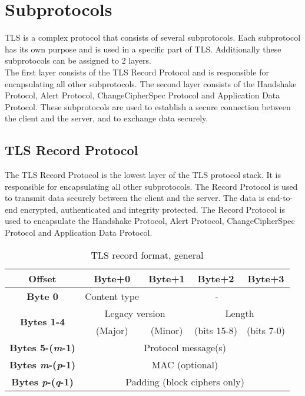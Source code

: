 \section{Subprotocols}

TLS is a complex protocol that consists of several subprotocols. Each subprotocol has its own purpose and is used in a specific part of TLS. Additionally these subprotocols can be assigned to 2 layers.
\\
The first layer consists of the TLS Record Protocol and is responsible for encapsulating all other subprotocols. The second layer consists of the Handshake Protocol, Alert Protocol, ChangeCipherSpec Protocol and Application Data Protocol. These subprotocols are used to establish a secure connection between the client and the server, and to exchange data securely.


\subsection{TLS Record Protocol}

The TLS Record Protocol is the lowest layer of the TLS protocol stack. It is responsible for encapsulating all other subprotocols. The Record Protocol is used to transmit data securely between the client and the server. The data is end-to-end encrypted, authenticated and integrity protected. The Record Protocol is used to encapsulate the Handshake Protocol, Alert Protocol, ChangeCipherSpec Protocol and Application Data Protocol.

\begin{table}[htbp]
	\centering
	\begin{tabular}{|c|c|c|c|c|}
	\hline
	\textbf{Offset} & \textbf{Byte+0} & \textbf{Byte+1} & \textbf{Byte+2} & \textbf{Byte+3} \\ \hline
	\textbf{Byte 0} & Content type & \multicolumn{3}{c|}{-} \\ \hline
	\multirow{2}{*}{\textbf{Bytes 1-4}} & \multicolumn{2}{c|}{Legacy version} & \multicolumn{2}{c|}{Length} \\ \cline{2-5} 
	 & (Major) & (Minor) & (bits 15-8) & (bits 7-0) \\ \hline
	\textbf{Bytes 5-(\textit{m}-1)} & \multicolumn{4}{c|}{Protocol message(s)} \\ \hline
	\textbf{Bytes \textit{m}-(\textit{p}-1)} & \multicolumn{4}{c|}{MAC (optional)} \\ \hline
	\textbf{Bytes \textit{p}-(\textit{q}-1)} & \multicolumn{4}{c|}{Padding (block ciphers only)} \\ \hline
	\end{tabular}
	\caption{TLS record format, general}
    \label{tab:tls_record_format}
\end{table}
	
